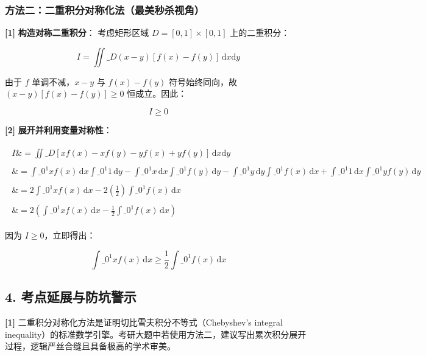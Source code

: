 \documentclass[11pt,a4paper,UTF8]{ctexart}
\begin{document}
\subsubsection{方法二：二重积分对称化法（最美秒杀视角）}
\begin{solbox}[分步推导与答题规范]
\textbf{[1]}  \textbf{构造对称二重积分}：
考虑矩形区域 $D = [0, 1] \times [0, 1]$ 上的二重积分：

\begin{equation*}
I = \iint\_D (x - y)[f(x) - f(y)]\,\mathrm{d}x\mathrm{d}y
\end{equation*}

由于 $f$ 单调不减，$x - y$ 与 $f(x) - f(y)$ 符号始终同向，故 $(x - y)[f(x) - f(y)] \ge 0$ 恒成立。因此：

\begin{equation*}
I \ge 0
\end{equation*}


\textbf{[2]}  \textbf{展开并利用变量对称性}：

\begin{align*}
\begin{aligned}
I \&= \iint\_D [x f(x) - x f(y) - y f(x) + y f(y)]\,\mathrm{d}x\mathrm{d}y \\ \\
\&= \int\_0^1 x f(x)\,\mathrm{d}x \int\_0^1 1\,\mathrm{d}y - \int\_0^1 x\,\mathrm{d}x \int\_0^1 f(y)\,\mathrm{d}y - \int\_0^1 y\,\mathrm{d}y \int\_0^1 f(x)\,\mathrm{d}x + \int\_0^1 1\,\mathrm{d}x \int\_0^1 y f(y)\,\mathrm{d}y \\ \\
\&= 2 \int\_0^1 x f(x)\,\mathrm{d}x - 2 \left( \frac{1}{2} \right) \int\_0^1 f(x)\,\mathrm{d}x \\ \\
\&= 2 \left( \int\_0^1 x f(x)\,\mathrm{d}x - \frac{1}{2}\int\_0^1 f(x)\,\mathrm{d}x \right)
\end{aligned}
\end{align*}

因为 $I \ge 0$，立即得出：

\begin{equation*}
\int\_0^1 x f(x)\,\mathrm{d}x \ge \frac{1}{2}\int\_0^1 f(x)\,\mathrm{d}x
\end{equation*}

\end{solbox}


\subsection{4. 考点延展与防坑警示}
\begin{solbox}[分步推导与答题规范]
\textbf{[1]}  二重积分对称化方法是证明切比雪夫积分不等式（Chebyshev's integral inequality）的标准数学引擎。考研大题中若使用方法二，建议写出累次积分展开过程，逻辑严丝合缝且具备极高的学术审美。
\end{solbox}
\end{document}
